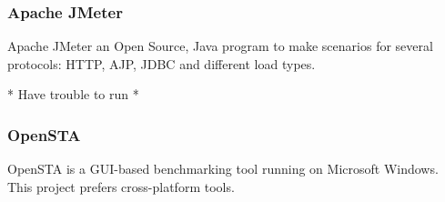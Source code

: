 \documentclass[12pt, a4paper, twoside]{article}
\begin{document}
\subsubsection{Apache JMeter}
Apache JMeter an Open Source, Java program to make scenarios for several protocols: HTTP, AJP, JDBC and different load types.

* Have trouble to run *


\subsubsection{OpenSTA}
OpenSTA is a GUI-based benchmarking tool running on Microsoft Windows.  This project prefers cross-platform tools.









\end{document}
